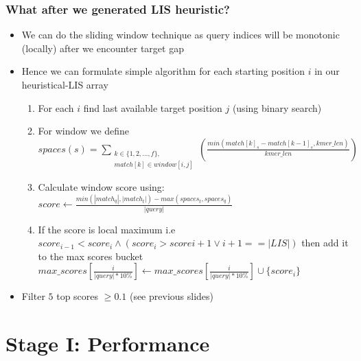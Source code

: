 \begin{frame}
  \frametitle{What after we generated LIS heuristic?}

  \begin{itemize}
    \item We can do the sliding window technique as query indices will be monotonic (locally) after we encounter target gap
    \item Hence we can formulate simple algorithm for each starting position $i$ in our heuristical-LIS array
    \begin{enumerate}
        \item For each $i$ find last available target position $j$ (using binary search)
        \item For window we define $spaces(s) = \sum_{\substack{k \in \{1,2,...,f\},\\match[k] \in window [i, j]}} {(\frac{min(match[k]_s-match[k-1]_s, kmer\_len)}{kmer\_len})}$
        \item Calculate window score using: $score \gets \frac{min(|match_q|, |match_t|) - max(spaces_t, spaces_q)}{|query|}$
        \item If the score is local maximum i.e $score_{i-1} < score_{i} \land (score_{i} > score{i+1} \lor i+1 == |LIS|)$ then add it to the max scores bucket $max\_scores[\frac{i}{|query|*10\%}] \gets max\_scores[\frac{i}{|query|*10\%}] \cup \{score_{i}\}$
    \end{enumerate}
    \item Filter $5$ top scores $\geq 0.1$ (see previous slides)
  \end{itemize}
\end{frame}

\section{Stage I: Performance}

